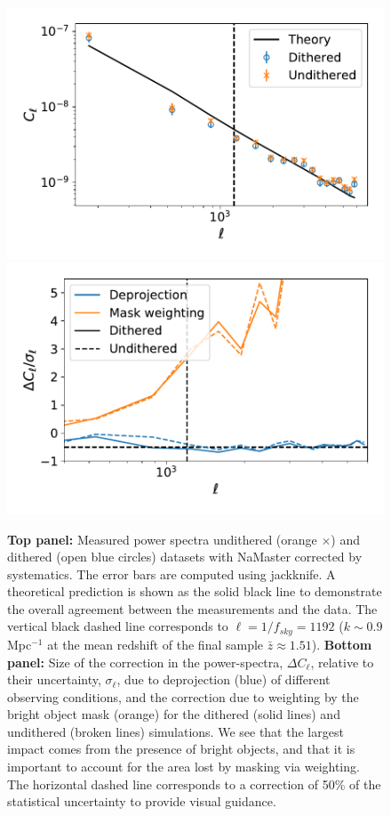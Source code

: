 \documentclass[\docopts]{\docclass}
\begin{document}
\begin{figure}
\centering
\includegraphics[width=0.9\columnwidth]{Cl_results_2019_comp}
\includegraphics[width=0.9\columnwidth]{systematics_comp_abs}
\caption{{\bf Top panel:} Measured power spectra undithered (orange $\times$) and dithered (open blue circles) datasets with NaMaster corrected by systematics. The error bars are computed using jackknife. A theoretical prediction is shown as the solid black line to demonstrate the overall agreement between the measurements and the data. The vertical black dashed line corresponds to $\ell = 1/f_{sky}=1192$ ($k \sim 0.9$ Mpc$^{-1}$ at the mean redshift of the final sample $\bar{z} \approx 1.51$). {\bf Bottom panel:} Size of the correction in the power-spectra, $\Delta C_{\ell}$, relative to their uncertainty, $\sigma_{\ell}$, due to deprojection (blue) of different observing conditions, and the correction due to weighting by the bright object mask (orange) for the dithered (solid lines) and undithered (broken lines) simulations. We see that the largest impact comes from the presence of bright objects, and that it is important to account for the area lost by masking via weighting. The horizontal dashed line corresponds to a correction of 50\% of the statistical uncertainty to provide visual guidance.} 
\label{fig:power_spectra}
\end{figure}
\end{document}
